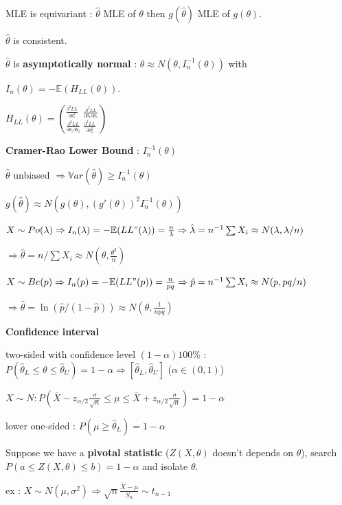 \documentclass[a4paper,10.5pt]{article}
\begin{document}
\begin{multicols}{4}
		MLE is equivariant : $\hat{\theta}$ MLE of $\theta$ then $g(\hat{\theta})$ MLE of $g(\theta)$.
		
		$\hat{\theta}$ is consistent.
		
		$\hat{\theta}$ is \textbf{asymptotically normal} : $\hat{\theta}\approx N(\theta, I_n^{-1}(\theta))$ with
		
		$I_n(\theta) = -\mathbb{E}(H_{LL}(\theta)).$
		
		$H_{LL}(\theta) = \left( ^{\frac{\partial^2LL}{\partial\theta_1^2}}_{\frac{\partial^2LL}{\partial\theta_1\partial\theta_2}}\  _{\frac{\partial^2LL}{\partial\theta_2^2}}^{\frac{\partial^2LL}{\partial\theta_1\partial\theta_2}}\right)$
		
		\textbf{Cramer-Rao Lower Bound} : $I_n^{-1}(\theta)$
		
		$\hat{\theta}$ unbiased $\Rightarrow \mathbb{V}ar(\hat{\theta})\geq I_n^{-1}(\theta)$
		
		$g(\hat{\theta}) \approx N(g(\theta),(g'(\theta))^2 I_n^{-1}(\theta))$
		
		$X\sim Po(\lambda) \Rightarrow I_n(\lambda) = -\mathbb{E}(LL"(\lambda)) = \frac{n}{\lambda} \Rightarrow \hat{\lambda} = n^{-1}\sum X_i \approx N(\lambda,\lambda/n)$
		
		$\Rightarrow \hat{\theta} = n/\sum X_i \approx N(\theta,\frac{\theta^3}{n})$
		
		$X\sim Be(p) \Rightarrow I_n(p) = -\mathbb{E}(LL"(p)) = \frac{n}{pq} \Rightarrow \hat{p} = n^{-1}\sum X_i \approx N(p,pq/n)$
		
		$\Rightarrow \hat{\theta} = \ln(\hat{p}/(1-\hat{p})) \approx N(\theta,\frac{1}{npq})$
		
		\textbf{Confidence interval}
		
		two-sided with confidence level $(1-\alpha)100\%$ : $P(\hat{\theta}_L \leq \theta \leq \hat{\theta}_U) = 1-\alpha \Rightarrow [\hat{\theta}_L,\hat{\theta}_U]$ ($\alpha\in (0,1)$)
		
		$X\sim N : P(\overline{X}-z_{\alpha/2}\frac{\sigma}{\sqrt{n}}\leq \mu \leq \overline{X}+z_{\alpha/2}\frac{\sigma}{\sqrt{n}}) = 1-\alpha$
		
		lower one-sided : $P(\mu \geq \hat{\theta}_L) = 1-\alpha$
		
		Suppose we have a \textbf{pivotal statistic} ($Z(X,\theta)$ doesn't depends on $\theta$), search $P(a\leq Z(X,\theta)\leq b) = 1-\alpha$ and isolate $\theta$.
		
		ex : $X\sim N(\mu,\sigma^2) \Rightarrow \sqrt{n}\frac{\overline{X}-\mu}{S_n}\sim t_{n-1}$
		

\end{multicols}
\end{document}
